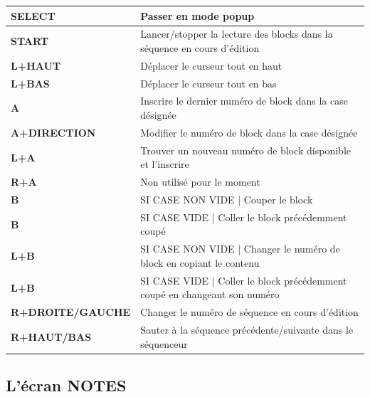 \documentclass[12pt,a4paper]{article}
\begin{document}
        \tablelasttail{\hline}
        \begin{supertabular}{|l|p{11cm}|}
        \hline
            {\bf SELECT} & Passer en mode popup \\
            \hline
            {\bf START} & Lancer/stopper la lecture des blocks dans la séquence en cours d'édition \\
            \hline
            {\bf L+HAUT} & Déplacer le curseur tout en haut \\
            \hline
            {\bf L+BAS} & Déplacer le curseur tout en bas \\
            \hline
            {\bf A} & Inscrire le dernier numéro de block dans la case désignée \\
            \hline
            {\bf A+DIRECTION} & Modifier le numéro de block dans la case désignée \\
            \hline
            {\bf L+A} & Trouver un nouveau numéro de block disponible et l'inscrire \\
            \hline
            {\bf R+A} & Non utilisé pour le moment \\
            \hline
            {\bf B} & SI CASE NON VIDE | Couper le block \\
            \hline
            {\bf B} & SI CASE VIDE | Coller le block précédemment coupé \\
            \hline
            {\bf L+B} & SI CASE NON VIDE | Changer le numéro de block en copiant le contenu \\
            \hline
            {\bf L+B} & SI CASE VIDE | Coller le block précédemment coupé en changeant son numéro \\
            \hline
            {\bf R+DROITE/GAUCHE} & Changer le numéro de séquence en cours d'édition \\
            \hline
            {\bf R+HAUT/BAS} & Sauter à la séquence précédente/suivante dans le séquenceur \\
        \hline
        \end{supertabular}
        
    
    \subsection{L'écran NOTES}
    
\end{document}
